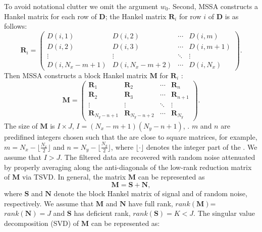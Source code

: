 To avoid notational clutter we omit the argument $w_0$. Second, MSSA constructs a Hankel matrix for each row of $\mathbf{D}$; the Hankel matrix $\mathbf{R}_i$ for row $i$ of $\mathbf{D}$ is as follows:
\begin{equation}
\label{eq:data}
\mathbf{R}_i=\left(\begin{array}{cccc}
D(i,1) & D(i,2) & \cdots &D(i,m) \\
D(i,2) & D(i,3)  &\cdots &D(i,m+1) \\
\vdots & \vdots &\ddots &\vdots \\
D(i,N_x-m+1)&D(i,N_x-m+2) &\cdots&D(i,N_x)
\end{array}
\right).
\end{equation}
Then MSSA constructs a block Hankel matrix $\mathbf{M}$ for $\mathbf{R}_i$ :
\begin{equation}
\label{eq:hankel2}
\mathbf{M}=\left(\begin{array}{cccc}
\mathbf{R}_1 &\mathbf{R}_2 & \cdots &\mathbf{R}_n \\
\mathbf{R}_2 &\mathbf{R}_3 &\cdots &\mathbf{R}_{n+1} \\
\vdots & \vdots &\ddots &\vdots \\
\mathbf{R}_{N_y-n+1}&\mathbf{R}_{N_y-n+2} &\cdots&\mathbf{R}_{N_y}
\end{array}
\right).
\end{equation}
The size of $\mathbf{M}$ is $I\times J$, $I=(N_x-m+1)(N_y-n+1)$, . $m$ and $n$ are predifined integers chosen such that the    are close to square matrices, for example, $m=N_x-\lfloor\frac{N_x}{2}\rfloor$ and $n=N_y-\lfloor\frac{N_y}{2}\rfloor$, where $\lfloor\cdot\rfloor$ denotes the integer part of the . We assume that $I>J$. The filtered data are recovered with random noise attenuated by properly averaging along the anti-diagonals of the low-rank reduction matrix of $\mathbf{M}$ via TSVD.  %
 In general, the matrix $\mathbf{M}$ can be represented as
\begin{equation}
\label{eq:M}
\mathbf{M}=\mathbf{S}+\mathbf{N},
\end{equation}
where $\mathbf{S}$ and $\mathbf{N}$ denote the block Hankel matrix of signal and of random noise, respectively. We assume that $\mathbf{M}$ and $\mathbf{N}$ have full rank, $rank(\mathbf{M})$=$rank(\mathbf{N})=J$ and $\mathbf{S}$ has deficient rank, $rank(\mathbf{S})=K<J$. The singular value decomposition (SVD) of $\mathbf{M}$ can be represented as:
